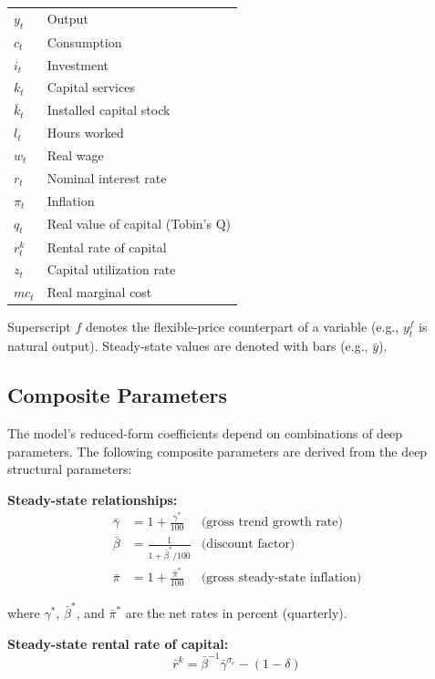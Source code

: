 \documentclass[12pt]{article}
\begin{document}
\begin{center}
\begin{tabular}{ll}
$y_t$ & Output \\
$c_t$ & Consumption \\
$i_t$ & Investment \\
$k_t$ & Capital services \\
$\bar{k}_t$ & Installed capital stock \\
$l_t$ & Hours worked \\
$w_t$ & Real wage \\
$r_t$ & Nominal interest rate \\
$\pi_t$ & Inflation \\
$q_t$ & Real value of capital (Tobin's Q) \\
$r^k_t$ & Rental rate of capital \\
$z_t$ & Capital utilization rate \\
$mc_t$ & Real marginal cost \\
\end{tabular}
\end{center}

Superscript $f$ denotes the flexible-price counterpart of a variable (e.g., $y^f_t$ is natural output). Steady-state values are denoted with bars (e.g., $\bar{y}$).

\subsection{Composite Parameters}

The model's reduced-form coefficients depend on combinations of deep parameters. The following composite parameters are derived from the deep structural parameters:

\textbf{Steady-state relationships:}
\begin{align}
\bar{\gamma} &= 1 + \frac{\gamma^*}{100} & \text{(gross trend growth rate)} \\
\bar{\beta} &= \frac{1}{1 + \bar{\beta}^*/100} & \text{(discount factor)} \\
\bar{\pi} &= 1 + \frac{\bar{\pi}^*}{100} & \text{(gross steady-state inflation)}
\end{align}

where $\gamma^*$, $\bar{\beta}^*$, and $\bar{\pi}^*$ are the net rates in percent (quarterly).

\textbf{Steady-state rental rate of capital:}
\begin{equation}
\bar{r}^k = \bar{\beta}^{-1}\bar{\gamma}^{\sigma_c} - (1-\delta)
\end{equation}
\end{document}
